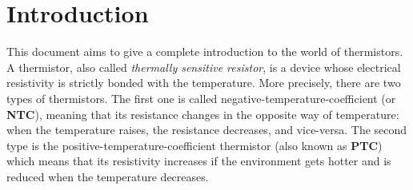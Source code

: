 \section{Introduction}
This document aims to give a complete introduction to the world of thermistors. A thermistor, also called \textsl{thermally sensitive resistor}, is a device whose electrical resistivity is strictly bonded with the temperature. More precisely, there are two types of thermistors. The first one is called negative-temperature-coefficient (or \textbf{NTC}), meaning that its resistance changes in the opposite way of temperature: when the temperature raises, the resistance decreases, and vice-versa. The second type is the positive-temperature-coefficient thermistor (also known as \textbf{PTC}) which means that its resistivity increases if the environment gets hotter and is reduced when the temperature decreases.





